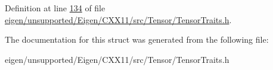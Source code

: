 Definition at line \hyperlink{eigen_2unsupported_2_eigen_2_c_x_x11_2src_2_tensor_2_tensor_traits_8h_source_l00134}{134} of file \hyperlink{eigen_2unsupported_2_eigen_2_c_x_x11_2src_2_tensor_2_tensor_traits_8h_source}{eigen/unsupported/\+Eigen/\+C\+X\+X11/src/\+Tensor/\+Tensor\+Traits.\+h}.



The documentation for this struct was generated from the following file\+:\begin{DoxyCompactItemize}
\item 
eigen/unsupported/\+Eigen/\+C\+X\+X11/src/\+Tensor/\+Tensor\+Traits.\+h\end{DoxyCompactItemize}
